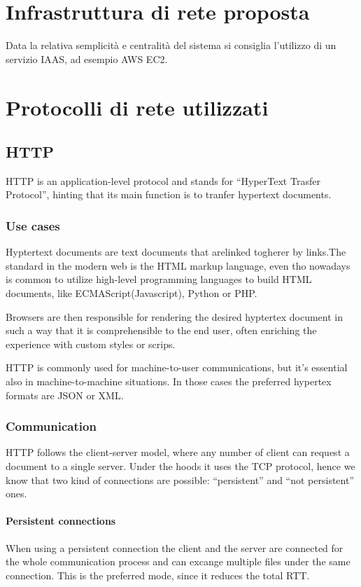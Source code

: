 \section{Infrastruttura di rete proposta}

Data la relativa semplicità e centralità del sistema si consiglia l'utilizzo di un servizio IAAS, ad esempio AWS EC2.

\section{Protocolli di rete utilizzati}

\subsection{HTTP}

HTTP is an application-level protocol and stands for ``HyperText Trasfer Protocol'', hinting that its main function is to tranfer hypertext documents.

\subsubsection{Use cases}

Hyptertext documents are text documents that arelinked togherer by links.The standard in the modern web is the HTML markup language, even tho nowadays is common to utilize high-level programming languages to build HTML documents, like ECMAScript(Javascript), Python or PHP.

Browsers are then responsible for rendering the desired hyptertex document in such a way that it is comprehensible to the end user, often enriching the experience with custom styles or scrips.

HTTP is commonly used for machine-to-user communications, but it's essential also in machine-to-machine situations. In those cases the preferred hypertex formats are JSON or XML.

\subsubsection{Communication}

HTTP follows the client-server model, where any number of client can request a document to a single server. Under the hoods it uses the TCP protocol, hence we know that two kind of connections are possible: ``persistent'' and ``not persistent'' ones.

\paragraph{Persistent connections}
When using a persistent connection the client and the server are connected for the whole communication process and can excange multiple files under the same connection. This is the preferred mode, since it reduces the total RTT.

